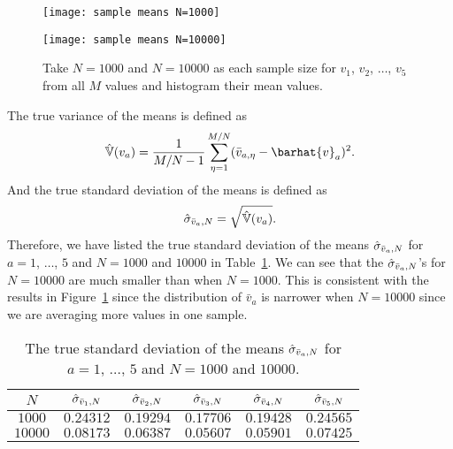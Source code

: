 \begin{figure}
    \centering
    \begin{minipage}[t]{0.8\linewidth}
        \centering
        \texttt{[image: sample means N=1000]}
        \label{fig:hist_mean:a}
    \end{minipage}
    \hfill
    \begin{minipage}[t]{0.8\linewidth}
        \centering
        \texttt{[image: sample means N=10000]}
        \label{fig:hist_mean:b}
    \end{minipage}
    \caption{Take \(N = 1000\) and \(N = 10000\) as each sample size
        for \(v_1\), \(v_2\), \(\ldots\), \(v_5\) from all \(M\) values
        and histogram their mean values.}
    \label{fig:hist_mean}
\end{figure}

The true variance of the means is defined as
%
\begin{equation}\label{eq:varva}
    \hat{\mathbb{V}}(v_a) = \frac{ 1 }{ M/N - 1 }
    \sum_{\eta=1}^{M/N} (\bar{v}_{a,\eta} - \barhat{v}_a)^2.
\end{equation}
%
And the true standard deviation of the means is defined as
%
\begin{equation}
    \hat{\sigma}_{\bar{v}_a,N} = \sqrt{\hat{\mathbb{V}}(v_a)}.
\end{equation}
%
Therefore, we have listed the true standard deviation of the means
\(\hat{\sigma}_{\bar{v}_a,N}\) for \(a = 1\), \(\ldots\), \(5\) and \(N = 1000\) and \(10000\)
in Table~\ref{tab:truestd}.
We can see that the \(\hat{\sigma}_{\bar{v}_a,N}\)'s for \(N = 10000\) are much smaller than
when \(N = 1000\). This is consistent with the results in Figure~\ref{fig:hist_mean}
since the distribution of \(\bar{v}_a\) is narrower when \(N = 10000\) since
we are averaging more values in one sample.

\begin{table}[H]
    \centering
    \caption{The true standard deviation of the means
        \(\hat{\sigma}_{\bar{v}_a,N}\) for \(a = 1\), \(\ldots\), \(5\) and \(N = 1000\) and \(10000\).}
    \label{tab:truestd}
    \begin{tabular}{@{}cccccc@{}}
        \toprule
        \(N\)     & \(\hat{\sigma}_{\bar{v}_1,N}\) & \(\hat{\sigma}_{\bar{v}_2,N}\) & \(\hat{\sigma}_{\bar{v}_3,N}\) & \(\hat{\sigma}_{\bar{v}_4,N}\) & \(\hat{\sigma}_{\bar{v}_5,N}\) \\
        \midrule
        \(1000\)  & \(0.24312\)   & \(0.19294\)   & \(0.17706\)   & \(0.19428\)   & \(0.24565\)   \\
        \(10000\) & \(0.08173\)   & \(0.06387\)   & \(0.05607\)   & \(0.05901\)   & \(0.07425\)   \\
        \bottomrule
    \end{tabular}
\end{table}


